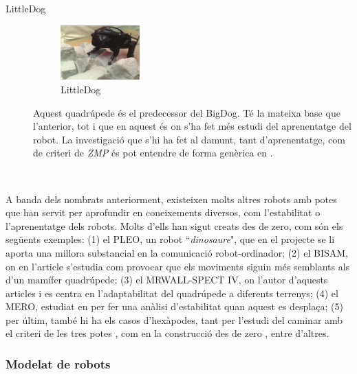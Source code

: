 \documentclass[12pt,a4paper,final,twoside]{article}
\begin{document}
\begin{description}
\item[LittleDog]
\begin{minipage}[t]{0.94\linewidth}
	\begin{figure}
	    \centering
		\includegraphics[width=0.30\textwidth]{Imatges/LittleDog}
                \caption{LittleDog \cite{Kalakrishnan2010}}
     \end{figure}
 Aquest quadrúpede és el predecessor del BigDog. Té la mateixa base que l'anterior, tot i que en aquest és on s'ha fet més estudi del aprenentatge del robot. La investigació que s'hi ha fet al damunt, tant d'aprenentatge, com de criteri de \textit{ZMP} és pot entendre de forma genèrica en \cite{Kalakrishnan2010}. 
\end{minipage}\\

\end{description}


A banda dels nombrats anteriorment, existeixen molts altres robots amb potes que han servit per aprofundir en coneixements diversos, com l'estabilitat o l'aprenentatge dels robots. Molts d'ells han sigut creats des de zero, com són els següents exemples: (1) el PLEO, un robot ``\textit{dinosaure}", que en el projecte \cite{Menendez2011} se li aporta una millora substancial en la comunicació robot-ordinador; (2) el BISAM, on en l'article \cite{Albiez2003} s'estudia com provocar que els moviments siguin més semblants als d'un mamífer quadrúpede; (3) el MRWALL-SPECT IV, on l'autor d'aquests articles \cite{Loc2010} i \cite{Loc2011} es centra en l'adaptabilitat del quadrúpede a diferents terrenys; (4) el MERO, estudiat en \cite{Ion} per fer una anàlisi d'estabilitat quan aquest es desplaça; (5) per últim, també hi ha els casos d'hexàpodes, tant per l'estudi del caminar amb el criteri de les tres potes \cite{Lee1988}, com en la construcció des de zero \cite{Lojo2009}, entre d'altres. 


\subsubsection{Modelat de robots}
\label{Modelat-de-robots}
\end{document}
